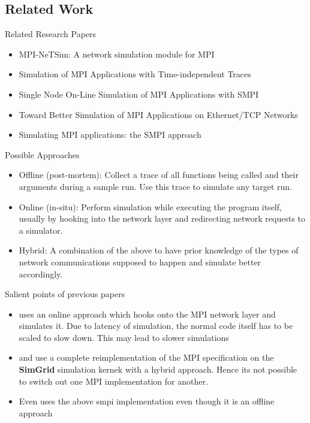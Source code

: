 \documentclass[pdf]{beamer}
\begin{document}
\subsection{Related Work}
\begin{frame}{Related Research Papers}
  \begin{itemize}
    \item MPI-NeTSim: A network simulation module for MPI \cite{netsim}
    \item Simulation of MPI Applications with Time-independent Traces
      \cite{time-independent-trace-sim}
    \item Single Node On-Line Simulation of MPI Applications with SMPI
      \cite{smpi-online}
    \item Toward Better Simulation of MPI Applications on Ethernet/TCP
      Networks \cite{better-sim-ethernet}
    \item Simulating MPI applications: the SMPI approach \cite{smpi}
  \end{itemize}
\end{frame}
\begin{frame}{Possible Approaches}
  \begin{itemize}
    \item<1-> Offline (post-mortem): Collect a trace of all functions being
      called and their arguments during a sample run. Use this trace to
      simulate any target run.
    \item<2-> Online (in-situ): Perform simulation while executing the program
      itself, usually by hooking into the network layer and redirecting network
      requests to a simulator.
    \item<3-> Hybrid: A combination of the above to have prior knowledge of the
      types of network communications supposed to happen and simulate better
      accordingly.
  \end{itemize}
\end{frame}
\begin{frame}{Salient points of previous papers}
  \begin{itemize}
    \item<1-> \cite{netsim} uses an online approach which hooks onto the MPI network
      layer and simulates it. Due to latency of simulation, the normal code itself
      has to be scaled to slow down. This may lead to slower simulations
    \item<2-> \cite{smpi} and \cite{smpi-online} use a complete reimplementation of
      the MPI specification on the \textbf{SimGrid} simulation kernek with a
      hybrid approach. Hence its not possible to switch out one MPI implementation
      for another.
    \item<3-> Even \cite{time-independent-trace-sim} uses the above smpi
      implementation even though it is an offline approach
  \end{itemize}
\end{frame}
\end{document}
